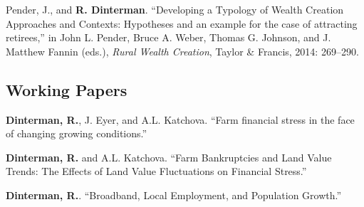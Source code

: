 \documentclass[letterpaper]{article}
\renewenvironment{itemize}{
  \begin{list}{}{
    \setlength{\leftmargin}{1.5em}
  }
}{
  \end{list}
}
\begin{document}
\begin{itemize}
\item Pender, J., and \textbf{R. Dinterman}. ``Developing a Typology of Wealth Creation Approaches and Contexts: Hypotheses and an example for the case of attracting retirees,'' in  John L. Pender, Bruce A. Weber, Thomas G. Johnson, and J. Matthew Fannin (eds.), \emph{Rural Wealth Creation}, Taylor \& Francis, 2014: 269--290.
\end{itemize}

% 
% 

\subsection*{Working Papers}

\begin{itemize}
\item \textbf{Dinterman, R.}, J. Eyer, and A.L. Katchova. ``Farm financial stress in the face of changing growing conditions.''
\item \textbf{Dinterman, R.} and A.L. Katchova. ``Farm Bankruptcies and Land Value Trends: The Effects of Land Value Fluctuations on Financial Stress.''
\item \textbf{Dinterman, R.}. ``Broadband, Local Employment, and Population Growth.''
\end{itemize}

% 
\end{document}
